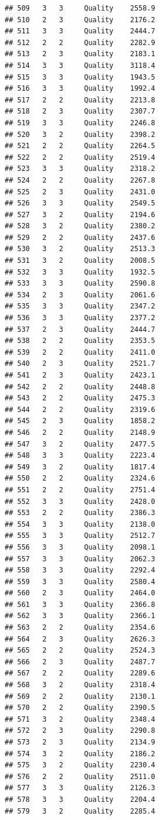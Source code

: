 \documentclass[12pt,]{krantz}
\theoremstyle{definition}
\theoremstyle{definition}
\theoremstyle{remark}
\begin{document}
\begin{verbatim}
## 509   3   3     Quality    2558.9
## 510   2   3     Quality    2176.2
## 511   3   3     Quality    2444.7
## 512   2   2     Quality    2282.9
## 513   2   3     Quality    2183.1
## 514   3   3     Quality    3118.4
## 515   3   3     Quality    1943.5
## 516   3   3     Quality    1992.4
## 517   2   2     Quality    2213.8
## 518   2   3     Quality    2307.7
## 519   3   3     Quality    2246.8
## 520   3   2     Quality    2398.2
## 521   2   2     Quality    2264.5
## 522   2   2     Quality    2519.4
## 523   3   3     Quality    2318.2
## 524   2   2     Quality    2267.8
## 525   2   3     Quality    2431.0
## 526   3   3     Quality    2549.5
## 527   3   2     Quality    2194.6
## 528   3   2     Quality    2380.2
## 529   2   2     Quality    2437.6
## 530   3   2     Quality    2513.3
## 531   3   2     Quality    2008.5
## 532   3   3     Quality    1932.5
## 533   3   3     Quality    2590.8
## 534   2   3     Quality    2061.6
## 535   3   3     Quality    2347.2
## 536   3   3     Quality    2377.2
## 537   2   3     Quality    2444.7
## 538   2   2     Quality    2353.5
## 539   2   2     Quality    2411.0
## 540   2   3     Quality    2521.7
## 541   2   3     Quality    2423.1
## 542   2   2     Quality    2448.8
## 543   2   2     Quality    2475.3
## 544   2   2     Quality    2319.6
## 545   2   3     Quality    1858.2
## 546   2   2     Quality    2148.9
## 547   3   2     Quality    2477.5
## 548   3   3     Quality    2223.4
## 549   3   2     Quality    1817.4
## 550   2   2     Quality    2324.6
## 551   2   2     Quality    2751.4
## 552   3   3     Quality    2428.0
## 553   2   2     Quality    2386.3
## 554   3   3     Quality    2138.0
## 555   3   3     Quality    2512.7
## 556   3   3     Quality    2098.1
## 557   3   3     Quality    2062.3
## 558   3   3     Quality    2292.4
## 559   3   3     Quality    2580.4
## 560   2   3     Quality    2464.0
## 561   3   3     Quality    2366.8
## 562   3   3     Quality    2366.1
## 563   2   2     Quality    2354.6
## 564   2   3     Quality    2626.3
## 565   2   2     Quality    2524.3
## 566   2   3     Quality    2487.7
## 567   2   2     Quality    2289.6
## 568   3   2     Quality    2318.4
## 569   2   2     Quality    2130.1
## 570   2   2     Quality    2390.5
## 571   3   2     Quality    2348.4
## 572   2   3     Quality    2290.8
## 573   2   3     Quality    2134.9
## 574   3   2     Quality    2186.2
## 575   3   2     Quality    2230.4
## 576   2   2     Quality    2511.0
## 577   3   3     Quality    2126.3
## 578   3   3     Quality    2204.4
## 579   3   2     Quality    2285.4

\end{verbatim}
\end{document}
